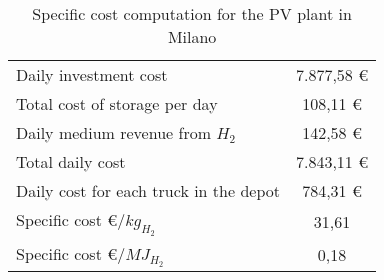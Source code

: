 \begin{table}
\centering
\begin{tabular}{|l|c|}
\hline
\rowcolor{bluepoli!40} \multicolumn{2}{|c|}{\textbf{Specific cost computation - Milano}}             \\ \hline
\multicolumn{1}{|l|}{Daily investment cost}                  & 7.877,58 €                            \\ \hline
\multicolumn{1}{|l|}{Total cost of storage per day}          & 108,11 €                              \\ \hline
\multicolumn{1}{|l|}{Daily medium revenue from $H_2$}        & 142,58 €                              \\ \hline
\multicolumn{1}{|l|}{Total daily cost}                       & 7.843,11 €                            \\ \hline
\multicolumn{1}{|l|}{Daily cost for each truck in the depot} & 784,31 €                              \\ \hline
\multicolumn{1}{|l|}{Specific cost €/$kg_{H_2}$}             & 31,61                                 \\ \hline
\multicolumn{1}{|l|}{Specific cost €/$MJ_{H_2}$}             & 0,18                                  \\ \hline
\end{tabular}
\caption{Specific cost computation for the PV plant in Milano}
\label{tab:specificcostmilan}
\end{table}